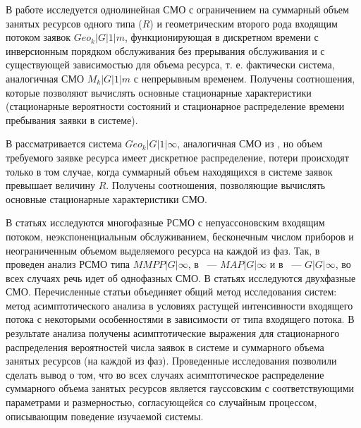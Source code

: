 \documentclass[a4paper,12pt]{article}
\begin{document}
В работе \cite{Pechinkin_28_2011} исследуется однолинейная СМО с ограничением на суммарный объем занятых ресурсов одного типа ($R$) и геометрическим второго рода входящим потоком заявок $Geo_k|G|1|m$, функционирующая в дискретном времени с инверсионным порядком обслуживания без прерывания обслуживания и с существующей зависимостью для объема ресурса, т. е. фактически система, аналогичная СМО $M_k|G|1|m$ с непрерывным временем. Получены соотношения, которые позволяют вычислять основные стационарные характеристики (стационарные вероятности состояний и стационарное распределение времени пребывания заявки в системе).

В \cite{Pechinkin_29_2012} рассматривается система $Geo_k|G|1|\infty$, аналогичная СМО из \cite{Pechinkin_28_2011}, но объем требуемого заявке ресурса имеет дискретное распределение, потери происходят только в том случае, когда суммарный объем находящихся в системе заявок превышает величину $R$. Получены соотношения, позволяющие вычислять основные стационарные характеристики СМО.

В статьях \cite{Mois_1_2017,Mois_2_2017,Mois_3_2016,Mois_4_2017,Mois_5_2017} исследуются многофазные РСМО с непуассоновским входящим потоком, неэкспоненциальным обслуживанием, бесконечным числом приборов и неограниченным объемом выделяемого ресурса на каждой из фаз. Так, в \cite{Mois_2_2017} проведен анализ РСМО типа $MMPP|G|\infty$, в \cite{Mois_3_2016} ~--- $MAP|G|\infty$ и в \cite{Mois_1_2017} ~--- $G|G|\infty$, во всех случаях речь идет об однофазных СМО.
В статьях \cite{Mois_4_2017,Mois_5_2017} исследуются двухфазные СМО.
Перечисленные статьи объединяет общий метод исследования систем: метод асимптотического анализа в условиях растущей интенсивности входящего потока с некоторыми особенностями в зависимости от типа входящего потока. В результате анализа получены асимптотические выражения для стационарного распределения вероятностей числа заявок в системе и суммарного объема занятых ресурсов (на каждой из фаз). Проведенные исследования позволили сделать вывод о том, что во всех случаях асимптотическое распределение суммарного объема занятых ресурсов является гауссовским с соответствующими параметрами и размерностью, согласующейся со случайным процессом, описывающим поведение изучаемой системы.
\end{document}
